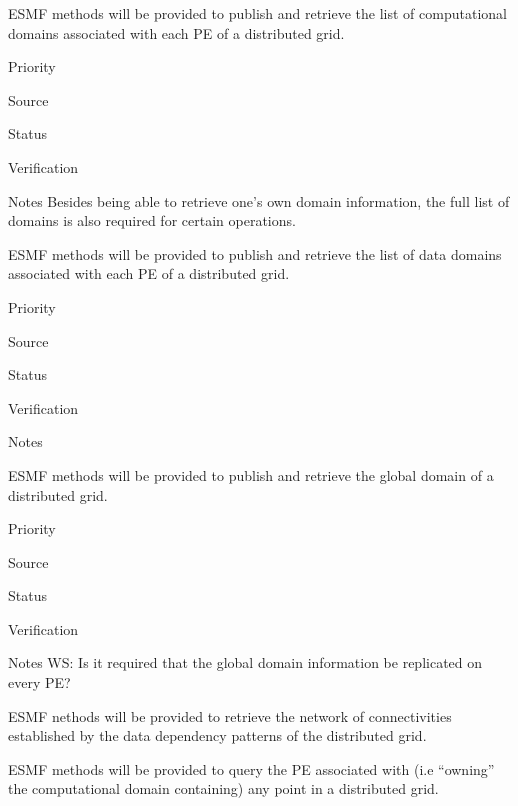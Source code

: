 
ESMF methods will be provided to publish and retrieve the list of
computational domains associated with each PE of a distributed grid.

\begin{reqlist}
\item[Priority]
\item[Source]
\item[Status]
\item[Verification]
\item[Notes] Besides being able to retrieve one's own domain
  information, the full list of domains is also required for certain
  operations.
\end{reqlist}


ESMF methods will be provided to publish and retrieve the list of
data domains associated with each PE of a distributed grid.

\begin{reqlist}
\item[Priority]
\item[Source]
\item[Status]
\item[Verification]
\item[Notes]
\end{reqlist}


ESMF methods will be provided to publish and retrieve the global
domain of a distributed grid.

\begin{reqlist}
\item[Priority]
\item[Source]
\item[Status]
\item[Verification]
\item[Notes] WS: Is it required that the global domain information 
be replicated on every PE?

\end{reqlist}


ESMF nethods will be provided to retrieve the network of
connectivities established by the data dependency patterns of the
distributed grid.


ESMF methods will be provided to query the PE associated with (i.e
``owning'' the computational domain containing) any point in a
distributed grid.

